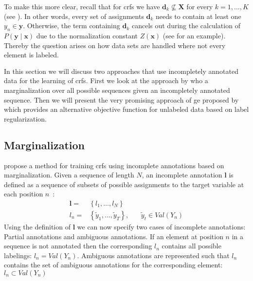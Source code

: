 To make this more clear, recall that for \glspl{crf} we have $\mathbf{d}_k\not\subseteq\mathbf{X}$ for every $k=1,\dots,K$ (see ).
In other words, every set of assignments $\mathbf{d}_k$ needs to contain at least one $y_n\in\mathbf{y}$.
Otherwise, the term containing $\mathbf{d}_k$ cancels out during the calculation of $P(\mathbf{y}\mid\mathbf{x})$ due to the normalization constant $Z(\mathbf{x})$ (see  for an example).
Thereby the question arises on how data sets are handled where not every element is labeled.

In this section we will discuss two approaches that use incompletely annotated data for the learning of \glspl{crf}.
First we look at the approach by \citet{tsuboi2008training} who a marginalization over all possible sequences given an incompletely annotated sequence.
Then we will present the very promising approach of \acrfull{ge} proposed by \citet{mann2007simple} which provides an alternative \gls{objective function} for unlabeled data based on \gls{label regularization}.

\subsection{Marginalization}

\citet{tsuboi2008training} propose a method for training \glspl{crf} using incomplete annotations based on marginalization.
Given a sequence of length $N$, an incomplete annotation $\bm{l}$ is defined as a sequence of subsets of possible assignments to the \gls{target variable} at each position $n$~\citep{tsuboi2008training}:
\begin{equation}
  \label{equ:incomplete-annotation}
  \begin{split}
  \bm{l}=& \left\{l_1,\dots,l_N\right\}\\
  l_n=& \left\{\tilde{y}_1,\dots,\tilde{y}_T\right\},\ \ \ \ \ \ \ \ \tilde{y}_t\in Val(Y_n)
  \end{split}
\end{equation}
Using the definition of $\bm{l}$ we can now specify two cases of incomplete annotations: Partial annotations and ambiguous annotations.
If an element at position $n$ in a sequence is not annotated then the corresponding $l_n$ contains all possible labelings: $l_n=Val(Y_n)$.
Ambiguous annotations are represented such that $l_n$ contains the set of ambiguous annotations for the corresponding element: $l_n\subset Val(Y_n)$


